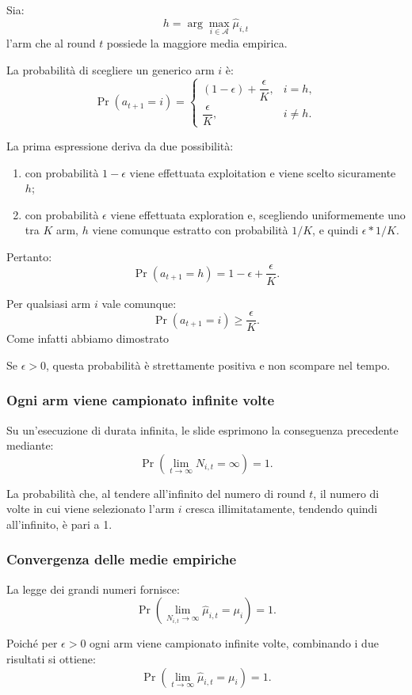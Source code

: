 Sia:
\[
h=
\arg\max_{i\in\mathcal{A}}
\widehat{\mu}_{i,t}
\]
l'arm che al round $t$ possiede la maggiore media empirica.

La probabilità di scegliere un generico arm $i$ è:
\[
\Pr(a_{t+1}=i)
=
\begin{cases}
(1-\epsilon)+\dfrac{\epsilon}{K},
& i=h,\\[2ex]
\dfrac{\epsilon}{K},
& i\neq h.
\end{cases}
\]

La prima espressione deriva da due possibilità:
\begin{enumerate}
    \item con probabilità $1-\epsilon$ viene effettuata exploitation e viene scelto sicuramente $h$;
    \item con probabilità $\epsilon$ viene effettuata exploration e, scegliendo uniformemente uno tra $K$ arm, $h$ viene comunque estratto con probabilità $1/K$, e quindi $\epsilon * 1/K$.
\end{enumerate}

Pertanto:
\[
\Pr(a_{t+1}=h)
=
1-\epsilon+\frac{\epsilon}{K}.
\]

Per qualsiasi arm $i$ vale comunque:
\[
\Pr(a_{t+1}=i)\geq\frac{\epsilon}{K}.
\]
Come infatti abbiamo dimostrato


Se $\epsilon>0$, questa probabilità è strettamente positiva e non scompare nel tempo.

\subsubsection{Ogni arm viene campionato infinite volte}

Su un'esecuzione di durata infinita, le slide esprimono la conseguenza precedente mediante:
\[
\Pr\left(
\lim_{t\rightarrow\infty}N_{i,t}=\infty
\right)=1.
\]

La probabilità che, al tendere all'infinito del numero di round \(t\), il numero di volte in cui viene selezionato l'arm \(i\) cresca illimitatamente, tendendo quindi all'infinito, è pari a 1.

\subsubsection{Convergenza delle medie empiriche}

La legge dei grandi numeri fornisce:
\[
\Pr\left(
\lim_{N_{i,t}\rightarrow\infty}
\widehat{\mu}_{i,t}
=
\mu_i
\right)=1.
\]

Poiché per $\epsilon>0$ ogni arm viene campionato infinite volte, combinando i due risultati si ottiene:
\[
\Pr\left(
\lim_{t\rightarrow\infty}
\widehat{\mu}_{i,t}
=
\mu_i
\right)=1.
\]

